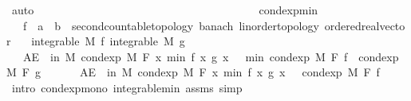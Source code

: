 \begin{isabellebody}
\ auto%
\endisatagproof
{\isafoldproof}%
%
\isadelimproof
\isanewline
%
\endisadelimproof
\ \ \ \ \ \ \ \ \ \ \ \ \ \ \ \ \ \ \ \ \ \ \ \ \ \ \ \ \ \ \ \ \ \ \ \ \ \ \isanewline
{}\isamarkupfalse%
\ cond{\isacharunderscore}{\kern0pt}exp{\isacharunderscore}{\kern0pt}min{\isacharcolon}{\kern0pt}\isanewline
\ \ \ f\ {\isacharcolon}{\kern0pt}{\isacharcolon}{\kern0pt}\ {\isachardoublequoteopen}{\isacharprime}{\kern0pt}a\ {\isasymRightarrow}\ {\isacharprime}{\kern0pt}b\ {\isacharcolon}{\kern0pt}{\isacharcolon}{\kern0pt}\ {\isacharbraceleft}{\kern0pt}second{\isacharunderscore}{\kern0pt}countable{\isacharunderscore}{\kern0pt}topology{\isacharcomma}{\kern0pt}\ banach{\isacharcomma}{\kern0pt}\ linorder{\isacharunderscore}{\kern0pt}topology{\isacharcomma}{\kern0pt}\ ordered{\isacharunderscore}{\kern0pt}real{\isacharunderscore}{\kern0pt}vector{\isacharbraceright}{\kern0pt}{\isachardoublequoteclose}\isanewline
\ \ \ {\isachardoublequoteopen}integrable\ M\ f{\isachardoublequoteclose}\ {\isachardoublequoteopen}integrable\ M\ g{\isachardoublequoteclose}\isanewline
\ \ \ {\isachardoublequoteopen}AE\ {\isasymxi}\ in\ M{\isachardot}{\kern0pt}\ cond{\isacharunderscore}{\kern0pt}exp\ M\ F\ {\isacharparenleft}{\kern0pt}{\isasymlambda}x{\isachardot}{\kern0pt}\ min\ {\isacharparenleft}{\kern0pt}f\ x{\isacharparenright}{\kern0pt}\ {\isacharparenleft}{\kern0pt}g\ x{\isacharparenright}{\kern0pt}{\isacharparenright}{\kern0pt}\ {\isasymxi}\ {\isasymle}\ min\ {\isacharparenleft}{\kern0pt}cond{\isacharunderscore}{\kern0pt}exp\ M\ F\ f\ {\isasymxi}{\isacharparenright}{\kern0pt}\ {\isacharparenleft}{\kern0pt}cond{\isacharunderscore}{\kern0pt}exp\ M\ F\ g\ {\isasymxi}{\isacharparenright}{\kern0pt}{\isachardoublequoteclose}\isanewline
%
\isadelimproof
%
\endisadelimproof
%
\isatagproof
{}\isamarkupfalse%
\ {\isacharminus}{\kern0pt}\isanewline
\ \ \isamarkupfalse%
\ {\isachardoublequoteopen}AE\ {\isasymxi}\ in\ M{\isachardot}{\kern0pt}\ cond{\isacharunderscore}{\kern0pt}exp\ M\ F\ {\isacharparenleft}{\kern0pt}{\isasymlambda}x{\isachardot}{\kern0pt}\ min\ {\isacharparenleft}{\kern0pt}f\ x{\isacharparenright}{\kern0pt}\ {\isacharparenleft}{\kern0pt}g\ x{\isacharparenright}{\kern0pt}{\isacharparenright}{\kern0pt}\ {\isasymxi}\ {\isasymle}\ cond{\isacharunderscore}{\kern0pt}exp\ M\ F\ f\ {\isasymxi}{\isachardoublequoteclose}\ \isamarkupfalse%
\ {\isacharparenleft}{\kern0pt}intro\ cond{\isacharunderscore}{\kern0pt}exp{\isacharunderscore}{\kern0pt}mono\ integrable{\isacharunderscore}{\kern0pt}min\ assms{\isacharcomma}{\kern0pt}\ simp{\isacharparenright}{\kern0pt}\isanewline

\end{isabellebody}
